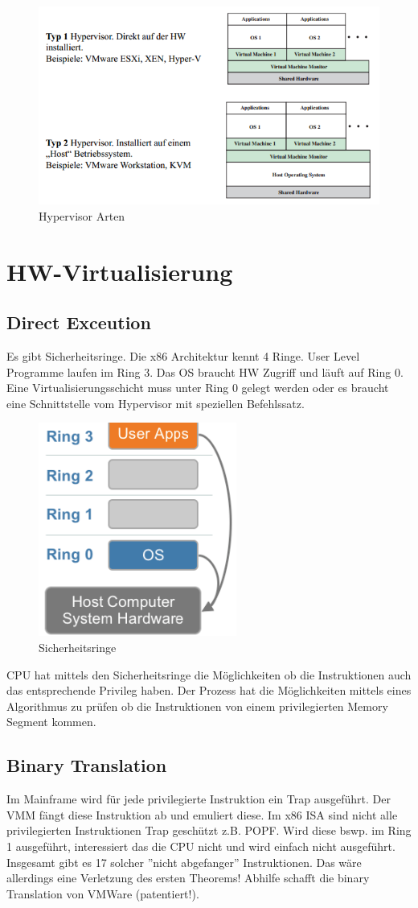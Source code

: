 \begin{figure}[h!]
\centering
\includegraphics[width=0.8\linewidth]{fig/hypervisor-types}
\caption{Hypervisor Arten}
\label{fig:hypervisor-types}
\end{figure}

\newpage

\section{HW-Virtualisierung}
\subsection{Direct Exceution}
Es gibt Sicherheitsringe. Die x86 Architektur kennt 4 Ringe. User Level Programme laufen im Ring 3. Das OS braucht HW Zugriff und läuft auf Ring 0. Eine Virtualisierungsschicht muss unter Ring 0 gelegt werden oder es braucht eine Schnittstelle vom Hypervisor mit speziellen Befehlssatz. 
\begin{figure}[h!]
\centering
\includegraphics[width=0.3\linewidth]{fig/sicherheitsringe}
\caption{Sicherheitsringe}
\label{fig:sicherheitsringe}
\end{figure}
CPU hat mittels den Sicherheitsringe die Möglichkeiten ob die Instruktionen auch das entsprechende Privileg haben. Der Prozess hat die Möglichkeiten mittels eines Algorithmus zu prüfen ob die Instruktionen von einem privilegierten Memory Segment kommen.

\subsection{Binary Translation}
Im Mainframe wird für jede privilegierte Instruktion ein Trap ausgeführt. Der VMM fängt diese Instruktion ab und emuliert diese. Im x86 ISA sind nicht alle privilegierten Instruktionen Trap geschützt z.B. POPF. Wird diese bswp. im Ring 1 ausgeführt, interessiert das die CPU nicht und wird einfach nicht ausgeführt. Insgesamt gibt es 17 solcher ''nicht abgefanger'' Instruktionen. Das wäre allerdings eine Verletzung des ersten Theorems! Abhilfe schafft die binary Translation von VMWare (patentiert!).

